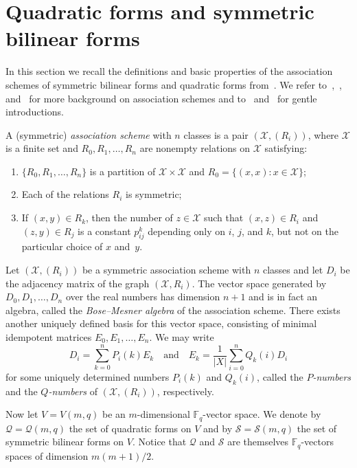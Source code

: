 \documentclass[10pt]{article}
\theoremstyle{definition}
\newcommand{\FF}{\mathbb{F}}
\newcommand{\Q}{\mathscr{Q}}
\renewcommand{\S}{\mathscr{S}}
\newcommand{\X}{\mathscr{X}}
\newcommand{\abs}[1]{\lvert#1\rvert}
\begin{document}
%

\section{Quadratic forms and symmetric bilinear forms}

In this section we recall the definitions and basic properties of the association schemes of symmetric bilinear forms and quadratic forms from~\cite{WanWanMaMa2003}. We refer to~\cite{Del1973},~\cite{DelLev1998}, and~\cite{BanIto1984} for more background on association schemes and to~\cite[Chapter~21]{MacSlo1977} and~\cite[Chapter~30]{vLiWil2001} for gentle introductions.
\par
A (symmetric) \emph{association scheme} with $n$ classes is a pair $(\X,(R_i))$, where $\X$ is a finite set and $R_0,R_1,\dots,R_n$ are nonempty relations on $\X$ satisfying:
\begin{enumerate}
\item %
$\{R_0,R_1,\dots,R_n\}$ is a partition of $\X\times\X$ and $R_0=\{(x,x):x\in \X\}$;
\item %
Each of the relations $R_i$ is symmetric;
\item %
If $(x,y)\in R_k$, then the number of $z\in \X$ such that $(x,z)\in R_i$ and $(z,y)\in R_j$ is a constant $p^k_{ij}$ depending only on $i$, $j$, and $k$, but not on the particular choice of $x$ and~$y$.
\end{enumerate}
\par
Let $(\X,(R_i))$ be a symmetric association scheme with $n$ classes and let $D_i$ be the adjacency matrix of the graph $(\X,R_i)$. The vector space generated by $D_0,D_1,\dots,D_n$ over the real numbers has dimension $n+1$ and is in fact an algebra, called the \emph{Bose--Mesner algebra} of the association scheme. There exists another uniquely defined basis for this vector space, consisting of minimal idempotent matrices $E_0,E_1,\dots,E_n$. We may write
\[
D_i=\sum_{k=0}^nP_i(k)E_k\quad\text{and}\quad E_k=\frac{1}{\abs{X}}\sum_{i=0}^nQ_k(i)D_i
\]
for some uniquely determined numbers $P_i(k)$ and $Q_k(i)$, called the \emph{$P$-numbers} and the \emph{$Q$-numbers} of $(\X,(R_i))$, respectively.
\par
Now let $V=V(m,q)$ be an $m$-dimensional $\FF_q$-vector space. We denote by 
$\Q=\Q(m,q)$ the set of quadratic forms on $V$ and by $\S=\S(m,q)$ the set of symmetric bilinear forms on $V$. Notice that $\Q$ and $\S$ are themselves $\FF_q$-vectors spaces of dimension $m(m+1)/2$.
\par
\end{document}
